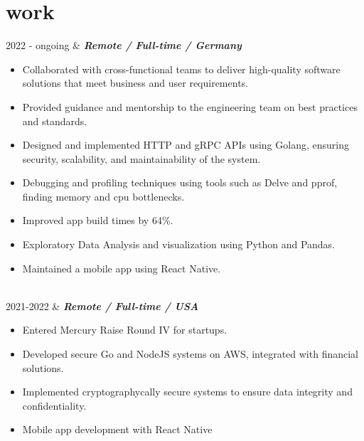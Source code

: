 \documentclass[]{cv-mauri}
\begin{document}
\section*{work}
\begin{tabularcv}
	2022 - ongoing   &   
					\textbf{\textit{Remote / Full-time / Germany}}

			\begin{itemize}
				\item Collaborated with cross-functional teams to deliver high-quality software solutions that meet business and user requirements.
				\item Provided guidance and mentorship to the engineering team on best practices and standards.
				\item Designed and implemented HTTP and gRPC APIs using Golang, ensuring security, scalability, and maintainability of the system.
				\item Debugging and profiling techniques using tools such as Delve and pprof, finding memory and cpu bottlenecks. 
				\item Improved app build times by 64\%.
				\item Exploratory Data Analysis and visualization using Python and Pandas.
				\item Maintained a mobile app using React Native.
			\end{itemize}
					\\[\vspacepar]

	2021-2022   &   
					\textbf{\textit{Remote / Full-time / USA}}

			\begin{itemize}
				\item Entered Mercury Raise Round IV for startups.
				\item Developed secure Go and NodeJS systems on AWS, integrated with financial solutions.
				\item Implemented cryptographycally secure systems to ensure data integrity and confidentiality.
				\item Mobile app development with React Native
			\end{itemize}
					\\[\vspacepar]
	

\end{tabularcv}
\end{document}
